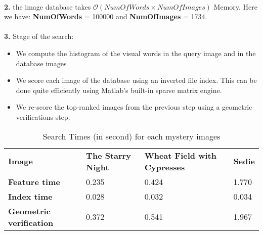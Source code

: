 \documentclass[11pt]{article}
\numberwithin{figure}{section} %
\begin{document}
\paragraph{}\textbf{2.} the image database takes $\mathcal{O}(NumOfWords \times NumOfImages)$ Memory. \newline
Here we have: \textbf{NumOfWords} = 100000 and \textbf{NumOfImages} = 1734.

\paragraph{}\textbf{3.}
Stage of the search:
\begin{itemize}
\item We compute the histogram of the visual words in the query image and in the database images
\item We score each image of the database using an inverted file index. This can be done quite efficiently using Matlab's built-in sparse matrix engine.
\item We re-score the top-ranked images from the previous step using a geometric verifications step.
\end{itemize}

\begin{table}[H]
\centering
\caption{Search Times (in second) for each mystery images}
\label{Images recognition}
\begin{tabular}{llll}
\rowcolor[HTML]{EFEFEF} 
{\color[HTML]{000000} \textbf{Image}} & {\color[HTML]{000000} \textbf{The Starry Night}} & {\color[HTML]{000000} \textbf{Wheat Field with Cypresses}} & {\color[HTML]{000000} \textbf{Sedie}} \\
\textbf{Feature time} & 0.235 & 0.424 & 1.770 \\
\textbf{Index time} & 0.028 & 0.032 & 0.034 \\
\textbf{Geometric verification} & 0.372 & 0.541 & 1.967
\end{tabular}
\end{table}
\end{document}
